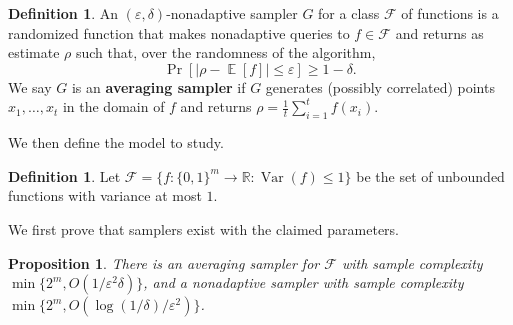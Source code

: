 \documentclass[11pt]{article}
\numberwithin{equation}{section}
\newtheorem{proposition}[theorem]{Proposition}
\theoremstyle{definition}
\newtheorem{definition}[theorem]{Definition}
\theoremstyle{plain}
\newcommand{\R}{\mathbb R}
\newcommand{\eps}{\varepsilon}
\newcommand{\zo}{\{0,1\}}
\newcommand{\ra}{\rightarrow}
\newcommand{\cF}{\mathcal{F}}
\DeclareMathOperator*{\E}{\mathbb{E}}
\newcommand{\var}{\operatorname{Var}}
\begin{document}
\begin{definition}
An $(\eps,\delta)$-nonadaptive sampler $G$ for a 
%
class $\cF$ of functions  %
is a randomized function that makes nonadaptive queries to $f\in \cF$ and returns as estimate $\rho$ such that, over the randomness of the algorithm,
\[\Pr[|\rho-\E[f]|\leq \eps]\geq 1- \delta.\]
We say $G$ is an \textbf{averaging sampler} if $G$ generates (possibly correlated) points $x_1,\ldots,x_t$ in the domain of $f$ and returns $\rho=\frac{1}{t}\sum_{i=1}^tf(x_i)$.
\end{definition}
We then define the model to study.
\begin{definition}
Let $\cF=\{f:\zo^m\ra\R:\var(f)\leq 1\}$ be the set of unbounded functions with variance at most $1$.
\end{definition}
We first prove that samplers exist with the claimed parameters. 
\begin{proposition}
There is an averaging sampler for $\cF$ with sample complexity $\min\{2^m,O(1/\eps^2\delta)\}$, and a nonadaptive sampler with sample complexity $\min\{2^m,O(\log(1/\delta)/\eps^2)\}$.
\end{proposition}
\end{document}
